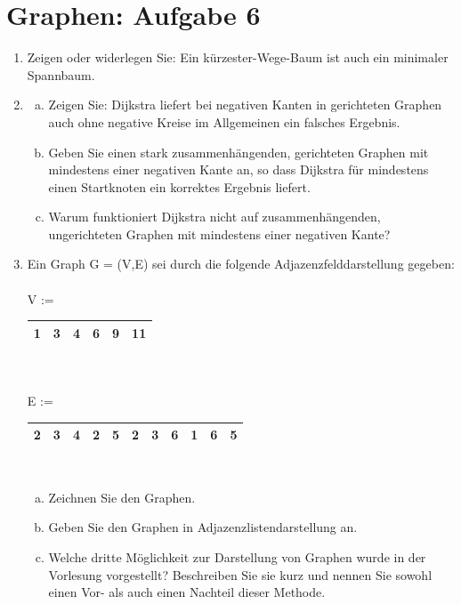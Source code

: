 \documentclass{scrartcl}
\begin{document}
\section*{Graphen: Aufgabe 6}
\begin{enumerate}[(1)]

\item Zeigen oder widerlegen Sie: Ein k\"urzester-Wege-Baum ist auch ein minimaler Spannbaum.

\item \begin{enumerate}[(a)]
\item Zeigen Sie: Dijkstra liefert bei negativen Kanten in gerichteten Graphen auch ohne negative Kreise im Allgemeinen ein falsches Ergebnis.
\item Geben Sie einen stark zusammenh\"angenden, gerichteten Graphen mit mindestens einer negativen Kante an, so dass Dijkstra f\"ur mindestens einen Startknoten ein korrektes Ergebnis liefert.
\item Warum funktioniert Dijkstra nicht auf zusammenh\"angenden, ungerichteten Graphen mit mindestens einer negativen Kante?
\end{enumerate}

\item Ein Graph G = (V,E) sei durch die folgende Adjazenzfelddarstellung gegeben:\\
\ \\
V := \begin{tabular}{|c|c|c|c|c|c|}
\hline 
1 & 3 & 4 & 6 & 9 & 11 \\ 
\hline 
\end{tabular}  \\
\ \\
E := \begin{tabular}{|c|c|c|c|c|c|c|c|c|c|c|}
\hline 
2 & 3 & 4 & 2 & 5 & 2 & 3 & 6 & 1 & 6 & 5 \\ 
\hline 
\end{tabular}\\
\begin{enumerate}[(a)]
	\item Zeichnen Sie den Graphen.
	\item Geben Sie den Graphen in Adjazenzlistendarstellung an.
	\item Welche dritte Möglichkeit zur Darstellung von Graphen wurde in der Vorlesung vorgestellt? Beschreiben Sie sie kurz und nennen Sie sowohl einen Vor- als auch einen Nachteil dieser Methode.
\end{enumerate} 


\end{enumerate}
\end{document}

